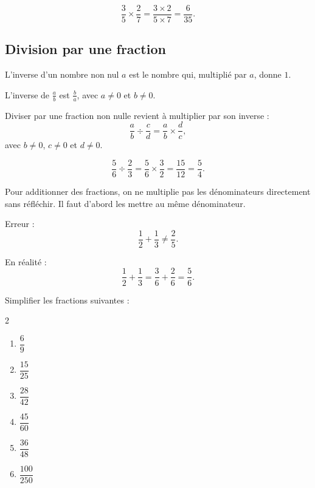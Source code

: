 \documentclass[11pt,a4paper]{article}
\newcounter{exercice}
\begin{document}
\begin{exemple}
\[
\frac{3}{5}\times \frac{2}{7}=\frac{3\times2}{5\times7}=\frac{6}{35}.
\]
\end{exemple}

\subsection{Division par une fraction}

\begin{definitionbox}
L'inverse d'un nombre non nul $a$ est le nombre qui, multiplié par $a$, donne $1$.

L'inverse de $\frac{a}{b}$ est $\frac{b}{a}$, avec $a\neq0$ et $b\neq0$.
\end{definitionbox}

\begin{propriete}
Diviser par une fraction non nulle revient à multiplier par son inverse :
\[
\frac{a}{b}\div \frac{c}{d}
=
\frac{a}{b}\times \frac{d}{c},
\]
avec $b\neq0$, $c\neq0$ et $d\neq0$.
\end{propriete}

\begin{exemple}
\[
\frac{5}{6}\div\frac{2}{3}
=
\frac{5}{6}\times\frac{3}{2}
=
\frac{15}{12}
=
\frac{5}{4}.
\]
\end{exemple}

\begin{attention}
Pour additionner des fractions, on ne multiplie pas les dénominateurs directement sans réfléchir. Il faut d'abord les mettre au même dénominateur.

Erreur :
\[
\frac{1}{2}+\frac{1}{3}\neq\frac{2}{5}.
\]

En réalité :
\[
\frac{1}{2}+\frac{1}{3}
=
\frac{3}{6}+\frac{2}{6}
=
\frac{5}{6}.
\]
\end{attention}

\begin{exercice}
Simplifier les fractions suivantes :
\begin{multicols}{2}
\begin{enumerate}[label=\alph*)]
  \item $\dfrac{6}{9}$
  \item $\dfrac{15}{25}$
  \item $\dfrac{28}{42}$
  \item $\dfrac{45}{60}$
  \item $\dfrac{36}{48}$
  \item $\dfrac{100}{250}$
\end{enumerate}
\end{multicols}
\end{exercice}
\end{document}
